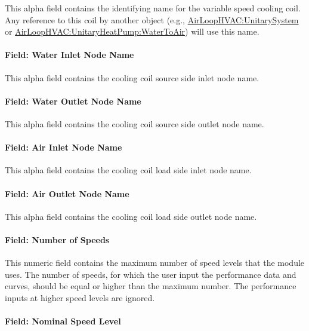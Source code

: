 This alpha field contains the identifying name for the variable speed cooling coil. Any reference to this coil by another object (e.g., \hyperref[airloophvacunitarysystem]{AirLoopHVAC:UnitarySystem} or \hyperref[airloophvacunitaryheatpumpwatertoair]{AirLoopHVAC:UnitaryHeatPump:WaterToAir}) will use this name.

\paragraph{Field: Water Inlet Node Name}\label{field-water-inlet-node-name-7}

This alpha field contains the cooling coil source side inlet node name.

\paragraph{Field: Water Outlet Node Name}\label{field-water-outlet-node-name-7-000}

This alpha field contains the cooling coil source side outlet node name.

\paragraph{Field: Air Inlet Node Name}\label{field-air-inlet-node-name-18}

This alpha field contains the cooling coil load side inlet node name.

\paragraph{Field: Air Outlet Node Name}\label{field-air-outlet-node-name-18}

This alpha field contains the cooling coil load side outlet node name.

\paragraph{Field: Number of Speeds}\label{field-number-of-speeds-4}

This numeric field contains the maximum number of speed levels that the module uses. The number of speeds, for which the user input the performance data and curves, should be equal or higher than the maximum number. The performance inputs at higher speed levels are ignored.

\paragraph{Field: Nominal Speed Level}\label{field-nominal-speed-level-2}

